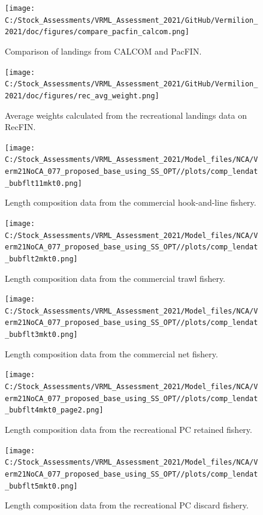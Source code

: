 \documentclass[
  english,
  a4paper,
]{article}
\begin{document}
\begin{figure}
\centering
\texttt{[image: C:/Stock\_Assessments/VRML\_Assessment\_2021/GitHub/Vermilion\_2021/doc/figures/compare\_pacfin\_calcom.png]}
\caption{Comparison of landings from CALCOM and PacFIN.\label{fig:calcom-pacfin}}
\end{figure}

\begin{figure}
\centering
\texttt{[image: C:/Stock\_Assessments/VRML\_Assessment\_2021/GitHub/Vermilion\_2021/doc/figures/rec\_avg\_weight.png]}
\caption{Average weights calculated from the recreational landings data on RecFIN.\label{fig:rec-avg-weights}}
\end{figure}

\begin{figure}
\centering
\texttt{[image: C:/Stock\_Assessments/VRML\_Assessment\_2021/Model\_files/NCA/Verm21NoCA\_077\_proposed\_base\_using\_SS\_OPT//plots/comp\_lendat\_bubflt11mkt0.png]}
\caption{Length composition data from the commercial hook-and-line fishery.\label{fig:len-data-COM-HKL}}
\end{figure}

\begin{figure}
\centering
\texttt{[image: C:/Stock\_Assessments/VRML\_Assessment\_2021/Model\_files/NCA/Verm21NoCA\_077\_proposed\_base\_using\_SS\_OPT//plots/comp\_lendat\_bubflt2mkt0.png]}
\caption{Length composition data from the commercial trawl fishery.\label{fig:len-data-COM-TWL}}
\end{figure}

\begin{figure}
\centering
\texttt{[image: C:/Stock\_Assessments/VRML\_Assessment\_2021/Model\_files/NCA/Verm21NoCA\_077\_proposed\_base\_using\_SS\_OPT//plots/comp\_lendat\_bubflt3mkt0.png]}
\caption{Length composition data from the commercial net fishery.\label{fig:len-data-COM-NET}}
\end{figure}

\begin{figure}
\centering
\texttt{[image: C:/Stock\_Assessments/VRML\_Assessment\_2021/Model\_files/NCA/Verm21NoCA\_077\_proposed\_base\_using\_SS\_OPT//plots/comp\_lendat\_bubflt4mkt0\_page2.png]}
\caption{Length composition data from the recreational PC retained fishery.\label{fig:len-data-REC-PC}}
\end{figure}

\begin{figure}
\centering
\texttt{[image: C:/Stock\_Assessments/VRML\_Assessment\_2021/Model\_files/NCA/Verm21NoCA\_077\_proposed\_base\_using\_SS\_OPT//plots/comp\_lendat\_bubflt5mkt0.png]}
\caption{Length composition data from the recreational PC discard fishery.\label{fig:len-data-REC-PC-DIS}}
\end{figure}
\end{document}
